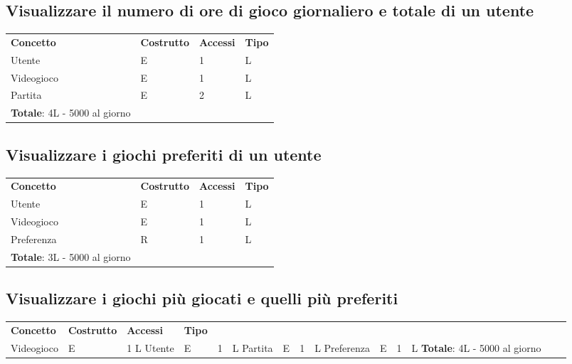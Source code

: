 \documentclass[a4paper,12pt]{report}
\begin{document}
\subsection*{Visualizzare il numero di ore di gioco giornaliero e totale di un utente}

\begin{table}[h!]
\begin{center}
	\begin{tabular}{ | m{4cm} P{4cm} P{4cm} P{4cm} | }
	\textbf{Concetto} & \textbf{Costrutto} & \textbf{Accessi} & \textbf{Tipo} \\
	Utente & E & 1 & L \\ \hline
	Videogioco & E & 1 & L \\ \hline
	Partita & E & 2 & L \\ \hline
	\textbf{Totale}: 4L - 5000 al giorno & & & \\
	\hline
	\end{tabular}
\end{center}
\end{table}

\subsection*{Visualizzare i giochi preferiti di un utente}

\begin{table}[h!]
\begin{center}
	\begin{tabular}{ | m{4cm} P{4cm} P{4cm} P{4cm} | }
	\textbf{Concetto} & \textbf{Costrutto} & \textbf{Accessi} & \textbf{Tipo} \\
	Utente & E & 1 & L \\ \hline
	Videogioco & E & 1 & L \\ \hline
	Preferenza & R & 1 & L \\ \hline
	\textbf{Totale}: 3L - 5000 al giorno & & & \\
	\hline
	\end{tabular}
\end{center}
\end{table}

\subsection*{Visualizzare i giochi più giocati e quelli più preferiti}

\begin{table}[h!]
\begin{center}
	\begin{tabular}{ | m{4cm} P{4cm} P{4cm} P{4cm} | }
	\textbf{Concetto} & \textbf{Costrutto} & \textbf{Accessi} & \textbf{Tipo} \\
	Videogioco & E & 1 L
	Utente & E & 1 & L
	Partita & E & 1 & L
	Preferenza & E & 1 & L	
	\textbf{Totale}: 4L - 5000 al giorno & & & \\
	\hline
	\end{tabular}
\end{center}
\end{table}
\end{document}
